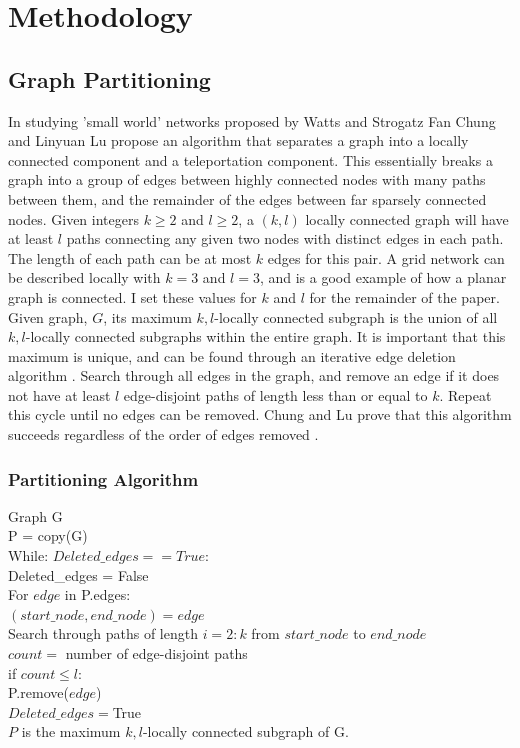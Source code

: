 \documentclass{article}
\begin{document}
\section{Methodology}
\subsection{Graph Partitioning}
In studying 'small world' networks proposed by Watts and Strogatz \cite{Watts:1998} Fan Chung and Linyuan Lu propose an algorithm that separates a graph into a locally connected component and a teleportation component. This essentially breaks a graph into a group of edges between highly connected nodes with many paths between them, and the remainder of the edges between far sparsely connected nodes. Given integers $k \geq 2$ and $l \geq 2$, a $(k,l)$ locally connected graph will have at least $l$ paths connecting any given two nodes with distinct edges in each path. The length of each path can be at most $k$ edges for this pair. A grid network can be described locally with $k=3$ and $l=3$, and is a good example of how a planar graph is connected. I set these values for $k$ and $l$ for the remainder of the paper. Given graph, $G$, its maximum $k,l$-locally connected subgraph is the union of all $k,l$-locally connected subgraphs within the entire graph. It is important that this maximum is unique, and can be found through an iterative edge deletion algorithm \cite{Chung:2004}. Search through all edges in the graph, and remove an edge if it does not have at least $l$ edge-disjoint paths of length less than or equal to $k$. Repeat this cycle until no edges can be removed. Chung and Lu prove that this algorithm succeeds regardless of the order of edges removed \cite{Chung:2004}. 

\subsubsection{Partitioning Algorithm}
Graph G\\
P = copy(G)\\
While: $Deleted\_edges == True$:\\
\indent Deleted\_edges = False\\
\indent For $edge$ in P.edges:\\
\indent \indent $(start\_node, end\_node) = edge$\\
\indent \indent Search through paths of length $i=2:k$ from $start\_node$ to $end\_node$\\
\indent \indent $count =$  number of edge-disjoint paths\\
\indent \indent if $count \leq l$:\\
\indent \indent \indent P.remove($edge$)\\
\indent \indent \indent $Deleted\_edges = $True\\
$P$ is the maximum $k,l$-locally connected subgraph of G.
	
\end{document}

